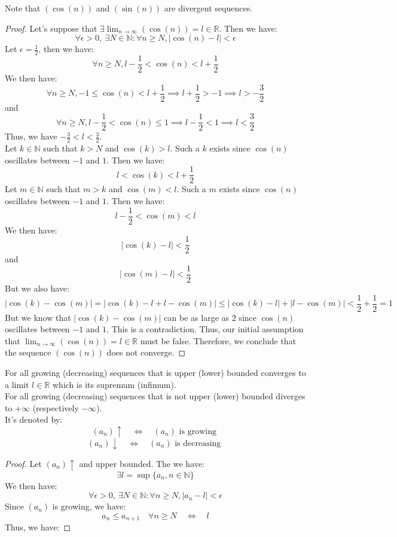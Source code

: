Note that $(\cos (n))$ and $(\sin (n))$ are divergent sequences.
\begin{proof}
    Let's suppose that $\exists \lim_{n \to \infty} (\cos (n)) = l \in \mathbb{R}$. Then we have:
    \[ \forall \epsilon > 0, \ \exists N \in \mathbb{N} : \forall n \geq N, |\cos (n) - l| < \epsilon \]
    Let $\epsilon = \frac{1}{2}$, then we have:
    \[ \forall n \geq N, l - \frac{1}{2} < \cos (n) < l + \frac{1}{2} \]
    We then have:
    \[ \forall n \geq N, -1 \leq \cos (n) < l + \frac{1}{2} \implies l + \frac{1}{2} > -1 \implies l > -\frac{3}{2} \]
    and
    \[ \forall n \geq N, l - \frac{1}{2} < \cos (n) \leq 1 \implies l - \frac{1}{2} < 1 \implies l < \frac{3}{2} \]
    Thus, we have $-\frac{3}{2} < l < \frac{3}{2}$. \\
    Let $k \in \mathbb{N}$ such that $k > N$ and $\cos (k) > l$. Such a $k$ exists since $\cos (n)$ oscillates between $-1$ and $1$. Then we have:
    \[ l < \cos (k) < l + \frac{1}{2} \]
    Let $m \in \mathbb{N}$ such that $m > k$ and $\cos (m) < l$. Such a $m$ exists since $\cos (n)$ oscillates between $-1$ and $1$. Then we have:
    \[ l - \frac{1}{2} < \cos (m) < l \]
    We then have:
    \[ |\cos (k) - l| < \frac{1}{2} \]
    and
    \[ |\cos (m) - l| < \frac{1}{2} \]
    But we also have:
    \[ |\cos (k) - \cos (m)| = |\cos (k) - l + l - \cos (m)| \leq |\cos (k) - l| + |l - \cos (m)| < \frac{1}{2} + \frac{1}{2} = 1 \]
    But we know that $|\cos (k) - \cos (m)|$ can be as large as $2$ since $\cos (n)$ oscillates between $-1$ and $1$. This is a contradiction. Thus, our initial assumption that $\lim_{n \to \infty} (\cos (n)) = l \in \mathbb{R}$ must be false. Therefore, we conclude that the sequence \( (\cos(n)) \) does not converge.
\end{proof}

\begin{theorem}
    For all growing (decreasing) sequences that is upper (lower) bounded converges to a limit $l \in \mathbb{R}$ which is its supremum (infimum). \\
    For all growing (decreasing) sequences that is not upper (lower) bounded diverges to $+\infty$ (respectively $-\infty$). \\
    It's denoted by:
    \[ (a_n) \uparrow \quad \Leftrightarrow \quad (a_n) \text{ is growing } \]
    \[ (a_n) \downarrow \quad \Leftrightarrow \quad (a_n) \text{ is decreasing } \]
\end{theorem}
\begin{proof}
    Let $(a_n) \uparrow$ and upper bounded. The we have:
    \[ \exists l = \sup \{a_n, n \in \mathbb{N}\} \]
    We then have:
    \[ \forall \epsilon > 0, \ \exists N \in \mathbb{N} : \forall n \geq N, |a_n - l| < \epsilon \]
    Since $(a_n)$ is growing, we have:
    \[ a_n \leq a_{n + 1} \quad \forall n \geq N \quad \Leftrightarrow \quad l \]
    Thus, we have:
\end{proof}

